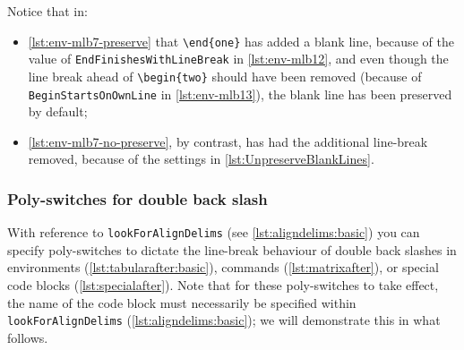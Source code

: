 
		Notice that in:
		\begin{itemize}
			\item \cref{lst:env-mlb7-preserve} that \lstinline!\end{one}! has added a blank line,
			      because of the value of \texttt{EndFinishesWithLineBreak} in \vref{lst:env-mlb12}, and
			      even though the line break ahead of \lstinline!\begin{two}! should have been removed
			      (because of \texttt{BeginStartsOnOwnLine} in \vref{lst:env-mlb13}), the blank line has
			      been preserved by default;
			\item \cref{lst:env-mlb7-no-preserve}, by contrast, has had the additional line-break removed,
			      because of the settings in \cref{lst:UnpreserveBlankLines}.
		\end{itemize}

\subsubsection{Poly-switches for double back slash}\label{subsec:dbs}
	With reference to \texttt{lookForAlignDelims} (see
	\vref{lst:aligndelims:basic})%
	 you can specify poly-switches to
	dictate the line-break behaviour of double back slashes in environments
	(\vref{lst:tabularafter:basic}), commands (\vref{lst:matrixafter}), or special code
	blocks (\vref{lst:specialafter}). Note that for these poly-switches to take effect, the
	name of the code block must necessarily be specified within \texttt{lookForAlignDelims}
	(\vref{lst:aligndelims:basic}); we will demonstrate this in what follows.

